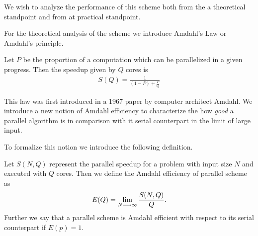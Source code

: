 We wish to analyze the performance of this scheme both from the a theoretical standpoint and from at practical standpoint. 

For the theoretical analysis of the scheme we introduce Amdahl's Law or Amdahl's principle.
\begin{mdframed}[innertopmargin=10pt]
\begin{principle}[Amdahl]
Let $ P $ be the proportion of a computation which can be parallelized in a given progress. Then the speedup given by
$ Q $ cores is
\begin{align}
	S(Q) = \frac{1}{(1-P)+\frac{P}{Q}}
\end{align}

\end{principle}
\end{mdframed}

This law was first introduced in a 1967 paper by computer architect Amdahl. We introduce a new notion of Amdahl efficiency to characterize the how \emph{good} a parallel algorithm is in comparison with it serial counterpart in the limit of large input. 

To formalize this notion we introduce the following definition.
\begin{mdframed}[innertopmargin=10pt]
\begin{definition}
\label{def:amdahl_efficient}
    Let $ S(N,Q) $ represent the parallel speedup for a problem with input size $ N $ and executed with $ Q $ cores.
    Then we define the Amdahl efficiency of parallel scheme as 
    \begin{align}
        E(Q) = \lim_{N \longrightarrow \infty} \frac{S(N, Q)}{Q}.
    \end{align}
    Further we say that a parallel scheme is Amdahl efficient with respect to its serial counterpart if $ E(p) = 1 $.
\end{definition}
\end{mdframed}

